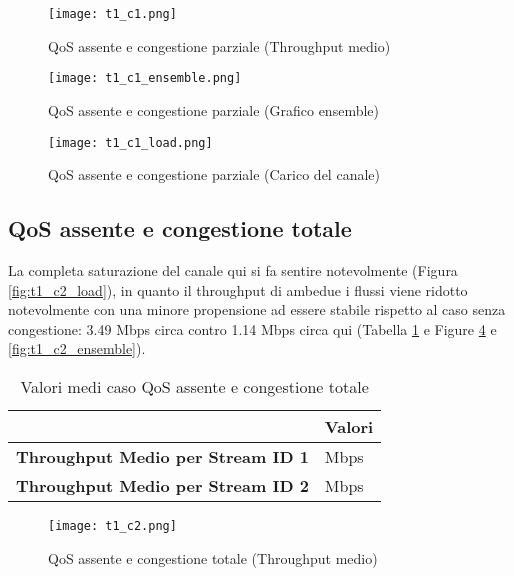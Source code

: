\begin{figure}[h!]
    \centering
    \texttt{[image: t1\_c1.png]}
    \caption{QoS assente e congestione parziale (Throughput medio)}
    \label{fig:t1_c1}
\end{figure}

\begin{figure}[h!]
    \centering
    \texttt{[image: t1\_c1\_ensemble.png]}
    \caption{QoS assente e congestione parziale (Grafico ensemble)}
    \label{fig:t1_c1_ensemble}
\end{figure}
\clearpage
\begin{figure}[h!]
    \centering
    \texttt{[image: t1\_c1\_load.png]}
    \caption{QoS assente e congestione parziale (Carico del canale)}
    \label{fig:t1_c1_load}
\end{figure}

\subsection[QoS assente e congestione totale]{QoS assente e congestione totale}
La completa saturazione del canale qui si fa sentire notevolmente (Figura \ref{fig:t1_c2_load}), in quanto il throughput di ambedue i flussi viene ridotto notevolmente con una minore propensione ad essere stabile rispetto al caso senza congestione: 3.49 Mbps circa contro 1.14 Mbps circa qui (Tabella \ref{table:8} e Figure \ref{fig:t1_c2} e \ref{fig:t1_c2_ensemble}).
\begin{table}[h!]
    \centering
    \begin{tabular}{|>{\centering\arraybackslash}p{20em}|>{\centering\arraybackslash}p{7em}|} 
     \hline
     \textbf{} & \textbf{Valori} \\ 
     \hline
     \textbf{Throughput Medio per Stream ID 1} & 1.14 Mbps \\ 
     \hline
     \textbf{Throughput Medio per Stream ID 2} & 1.19 Mbps \\
     \hline
    \end{tabular}
    \caption{Valori medi caso QoS assente e congestione totale}
    \label{table:8}
\end{table}

\begin{figure}[h!]
    \centering
    \texttt{[image: t1\_c2.png]}
    \caption{QoS assente e congestione totale (Throughput medio)}
    \label{fig:t1_c2}
\end{figure}

